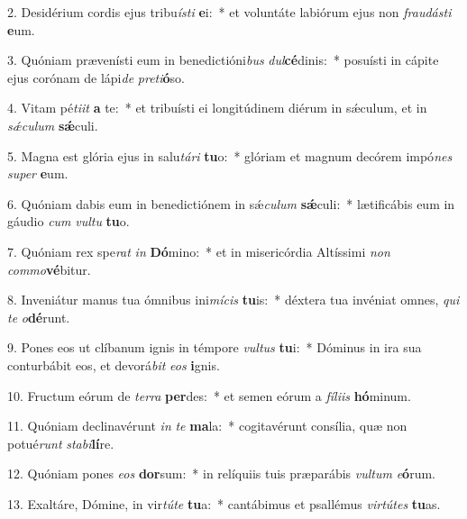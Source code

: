 2. Desidérium cordis ejus tribu\textit{ís}\textit{ti} \textbf{e}i:~*  et voluntáte labiórum ejus non \textit{frau}\textit{dás}\textit{ti} \textbf{e}um.\

3. Quóniam prævenísti eum in benedictióni\textit{bus} \textit{dul}\textbf{cé}dinis:~*  posuísti in cápite ejus corónam de lápi\textit{de} \textit{pre}\textit{ti}\textbf{ó}so.\

4. Vitam pé\textit{ti}\textit{it} \textbf{a} te:~*  et tribuísti ei longitúdinem diérum in sǽculum, et in \textit{sǽ}\textit{cu}\textit{lum} \textbf{sǽ}culi.\

5. Magna est glória ejus in salu\textit{tá}\textit{ri} \textbf{tu}o:~*  glóriam et magnum decórem impó\textit{nes} \textit{su}\textit{per} \textbf{e}um.\

6. Quóniam dabis eum in benedictiónem in sǽ\textit{cu}\textit{lum} \textbf{sǽ}culi:~*  lætificábis eum in gáudio \textit{cum} \textit{vul}\textit{tu} \textbf{tu}o.\

7. Quóniam rex spe\textit{rat} \textit{in} \textbf{Dó}mino:~*  et in misericórdia Altíssimi \textit{non} \textit{com}\textit{mo}\textbf{vé}bitur.\

8. Inveniátur manus tua ómnibus ini\textit{mí}\textit{cis} \textbf{tu}is:~*  déxtera tua invéniat omnes, \textit{qui} \textit{te} \textit{o}\textbf{dé}runt.\

9. Pones eos ut clíbanum ignis in témpore \textit{vul}\textit{tus} \textbf{tu}i:~*  Dóminus in ira sua conturbábit eos, et devorá\textit{bit} \textit{e}\textit{os} \textbf{i}gnis.\

10. Fructum eórum de \textit{ter}\textit{ra} \textbf{per}des:~*  et semen eórum a \textit{fí}\textit{li}\textit{is} \textbf{hó}minum.\

11. Quóniam declinavérunt \textit{in} \textit{te} \textbf{ma}la:~*  cogitavérunt consília, quæ non potué\textit{runt} \textit{sta}\textit{bi}\textbf{lí}re.\

12. Quóniam pones \textit{e}\textit{os} \textbf{dor}sum:~*  in relíquiis tuis præparábis \textit{vul}\textit{tum} \textit{e}\textbf{ó}rum.\

13. Exaltáre, Dómine, in vir\textit{tú}\textit{te} \textbf{tu}a:~*  cantábimus et psallémus \textit{vir}\textit{tú}\textit{tes} \textbf{tu}as.\

